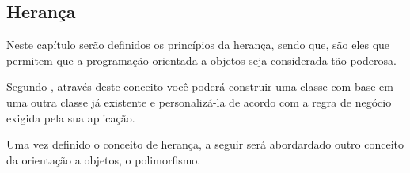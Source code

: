 \subsection{Herança}
\label{heranca}

Neste capítulo serão definidos os princípios da herança, sendo que, são eles que
permitem que a programação orientada a objetos seja considerada tão poderosa.

Segundo , através deste conceito você poderá
construir uma classe com base em uma outra classe já existente e personalizá-la
de acordo com a regra de negócio exigida pela sua aplicação.

Uma vez definido o conceito de herança, a seguir será abordardado outro conceito
da orientação a objetos, o polimorfismo.
